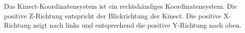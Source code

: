 \noindent
Das Kinect-Koordinatensystem ist ein rechtshändiges Koordinatensystem. Die positive Z-Richtung entspricht der Blickrichtung der Kinect. Die positive X-Richtung zeigt nach links und entsprechend die positive Y-Richtung nach oben. \cite{ws:microsoft_coordinateSpaces}

